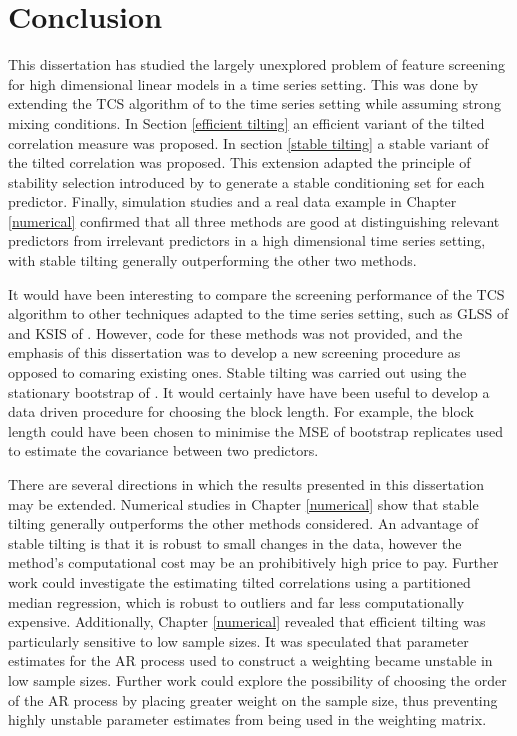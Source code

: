 \documentclass[11pt]{report}\usepackage[utf8]{inputenc}
\begin{document}
\chapter{Conclusion} \label{conclusion}

This dissertation has studied the largely unexplored problem of feature screening for high dimensional linear models in a time series setting. This was done by extending the TCS algorithm of \cite{cho2012high} to the time series setting while assuming strong mixing conditions. In Section \ref{efficient tilting} an efficient variant of the tilted correlation measure was proposed. In section \ref{stable tilting} a stable variant of the tilted correlation was proposed. This extension adapted the principle of stability selection introduced by \cite{meinshausen2010stability} to generate a stable conditioning set for each predictor. Finally, simulation studies and a real data example in Chapter \ref{numerical} confirmed that all three methods are good at distinguishing relevant predictors from irrelevant predictors in a high dimensional time series setting, with stable tilting generally outperforming the other two methods. 

It would have been interesting to compare the screening performance of the TCS algorithm to other techniques adapted to the time series setting, such as GLSS of \cite{yousuf2018variable} and KSIS of \cite{chen2018semiparametric}. However, code for these methods was not provided, and the emphasis of this dissertation was to develop a new screening procedure as opposed to comaring existing ones. Stable tilting was carried out using the stationary bootstrap of \cite{politis1994stationary}. It would certainly have have been useful to develop a data driven procedure for choosing the block length. For example, the block length could have been chosen to minimise the MSE of bootstrap replicates used to estimate the covariance between two predictors.  

There are several directions in which the results presented in this dissertation may be extended. Numerical studies in Chapter \ref{numerical} show that stable tilting generally outperforms the other methods considered. An advantage of stable tilting is that it is robust to small changes in the data, however the method's computational cost may be an prohibitively high price to pay. Further work could investigate the estimating tilted correlations using a partitioned median regression, which is robust to outliers and far less computationally expensive. Additionally, Chapter \ref{numerical} revealed that efficient tilting was particularly sensitive to low sample sizes. It was speculated that parameter estimates for the AR process used to construct a weighting became unstable in low sample sizes. Further work could explore the possibility of choosing the order of the AR process by placing greater weight on the sample size, thus preventing highly unstable parameter estimates from being used in the weighting matrix. 

% 

\end{document}
